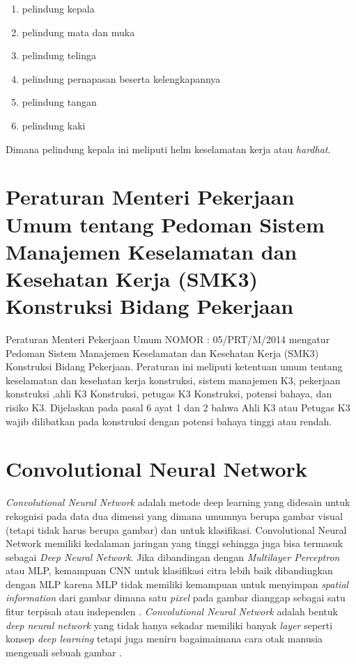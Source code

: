 \begin{enumerate}[nolistsep]
    \item pelindung kepala
    \item pelindung mata dan muka
    \item pelindung telinga
    \item pelindung pernapasan beserta kelengkapannya
    \item pelindung tangan
    \item pelindung kaki
\end{enumerate}
Dimana pelindung kepala ini meliputi helm keselamatan kerja atau \emph{hardhat}.

\newpage

\section{Peraturan Menteri Pekerjaan Umum tentang Pedoman Sistem Manajemen Keselamatan dan Kesehatan Kerja (SMK3) Konstruksi Bidang Pekerjaan}
\label{sec:peraturansmk3}

\par Peraturan Menteri Pekerjaan Umum NOMOR : 05/PRT/M/2014 mengatur Pedoman Sistem Manajemen Keselamatan dan Kesehatan Kerja (SMK3) Konstruksi Bidang Pekerjaan.
Peraturan ini meliputi ketentuan umum tentang keselamatan dan kesehatan kerja konstruksi, sistem manajemen K3, pekerjaan konstruksi
,ahli K3 Konstruksi, petugas K3 Konstruksi, potensi bahaya, dan risiko K3. Dijelaskan pada pasal 6 ayat 1 dan 2 bahwa Ahli K3 atau Petugas K3 wajib dilibatkan pada konstruksi
dengan potensi bahaya tinggi atau rendah.


\section{Convolutional Neural Network}
\label{sec:convolutionalneuralnetwork}

\par \emph{Convolutional Neural Network} adalah metode deep learning yang didesain untuk rekognisi pada data dua 
dimensi yang dimana umumnya berupa gambar visual (tetapi tidak harus berupa gambar) dan untuk klasifikasi.
Convolutional Neural Network memiliki kedalaman jaringan yang tinggi sehingga juga bisa termasuk sebagai \emph{Deep Neural Network}.
Jika dibandingan dengan \emph{Multilayer Perceptron} atau MLP, kemampuan CNN untuk klasifikasi citra lebih baik dibandingkan dengan MLP karena MLP tidak memiliki
kemampuan untuk menyimpan \emph{spatial information} dari gambar dimana satu \emph{pixel} pada gambar dianggap sebagai satu fitur
terpisah atau independen \cite{putra2016klasifikasi}. \emph{Convolutional Neural Network} adalah bentuk \emph{deep neural network} yang tidak hanya
sekadar memiliki banyak \emph{layer} seperti konsep \emph{deep learning} tetapi juga meniru bagaimaimana cara otak manusia mengenali sebuah gambar \cite{kim2017convolutional}.

